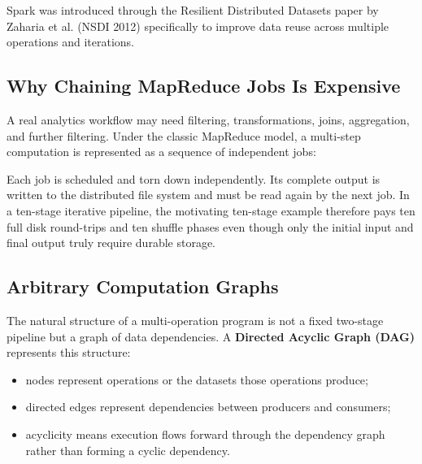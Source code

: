 \documentclass[11pt,a4paper,oneside]{book}
\begin{document}
Spark was introduced through the Resilient Distributed Datasets paper by Zaharia et al. (NSDI 2012) specifically to improve data reuse across multiple operations and iterations.

\subsection{Why Chaining MapReduce Jobs Is Expensive}

A real analytics workflow may need filtering, transformations, joins, aggregation, and further filtering. Under the classic MapReduce model, a multi-step computation is represented as a sequence of independent jobs:

\begin{center}
\end{center}

Each job is scheduled and torn down independently. Its complete output is written to the distributed file system and must be read again by the next job. In a ten-stage iterative pipeline, the motivating ten-stage example therefore pays ten full disk round-trips and ten shuffle phases even though only the initial input and final output truly require durable storage.

\subsection{Arbitrary Computation Graphs}

The natural structure of a multi-operation program is not a fixed two-stage pipeline but a graph of data dependencies. A \textbf{Directed Acyclic Graph (DAG)} represents this structure:

\begin{itemize}
    \item nodes represent operations or the datasets those operations produce;
    \item directed edges represent dependencies between producers and consumers;
    \item acyclicity means execution flows forward through the dependency graph rather than forming a cyclic dependency.
\end{itemize}
\end{document}
